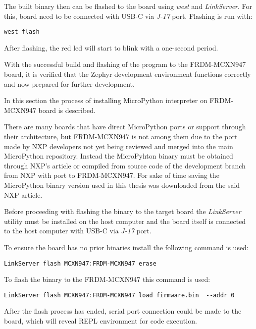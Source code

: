 \documentclass[twoside, 12pt]{article}
\begin{document}
The built binary then can be flashed to the board using \textit{west} and \textit{LinkServer}. For this, board need to be connected with USB-C via \textit{J-17} port.
Flashing is run with:
\begin{lstlisting}[caption=Flashin a program]
west flash
\end{lstlisting}
After flashing, the red led will start to blink with a one-second period.

With the successful build and flashing of the program to the FRDM-MCXN947 board, it is 
verified that the Zephyr development environment functions correctly and now prepared for 
further development.

In this section the process of installing MicroPython interpreter on FRDM-MCXN947 board is 
described.
    
    There are many boards that have direct MicroPython ports or support through their
architecture\cite{mpy_boards}, but FRDM-MCXN947 is not among them due to the port made by NXP 
developers not yet being reviewed and merged into the main MicroPython repository. Instead 
the MicroPyhton binary must be obtained through NXP's article\cite{mcxn947_mpy_bin} or 
compiled from source code of the development branch from NXP with port to FRDM-MCXN947.
For sake of time saving the MicroPython binary version used in this thesis was downloaded 
from the said NXP article.

Before proceeding with flashing the binary to the target board the \textit{LinkServer} 
utility must be installed on the host computer and the board itself is connected to the host 
computer with USB-C via \textit{J-17} port.

To ensure the board has no prior binaries install the following command is used:
\begin{lstlisting}[caption=LinkServer erase]
LinkServer flash MCXN947:FRDM-MCXN947 erase
\end{lstlisting}

To flash the binary to the FRDM-MCXN947 this command is used:
\begin{lstlisting}[caption=LinkServer flash,breaklines=true]
LinkServer flash MCXN947:FRDM-MCXN947 load firmware.bin  --addr 0
\end{lstlisting}
After the flash process has ended, serial port connection could be made to the board, which will reveal REPL environment for code execution.

\obrazek
{}
\end{document}
